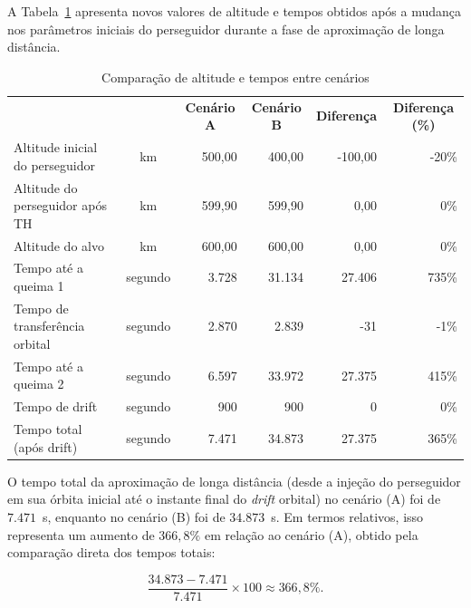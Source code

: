 A Tabela~\ref{tab_cap4_comp_alt_tempos} apresenta novos valores de altitude e tempos obtidos após a mudança nos parâmetros iniciais do perseguidor durante a fase de aproximação de longa distância.

\begin{table}[H]
\centering
\caption{Comparação de altitude e tempos entre cenários}
\begin{tabularx}{\linewidth}{|>{\raggedright\arraybackslash}X|
                             >{\raggedright\arraybackslash}c|
                             r|r|r|r|}
\hline
\multicolumn{1}{|c|}{\textbf{Variável}} &
\multicolumn{1}{c|}{\textbf{Unidade}} &
\multicolumn{1}{c|}{\textbf{Cenário A}} &
\multicolumn{1}{c|}{\textbf{Cenário B}} &
\multicolumn{1}{c|}{\textbf{Diferença}} &
\multicolumn{1}{c|}{\textbf{Diferença (\%)}} \\
\hhline{|=|=|=|=|=|=|}
Altitude inicial do perseguidor      & km     & 500,00 & 400,00 & -100,00 & -20\% \\
\hline
Altitude do perseguidor após TH      & km     & 599,90 & 599,90 & 0,00    & 0\%   \\
\hline
Altitude do alvo                     & km     & 600,00 & 600,00 & 0,00    & 0\%   \\
\hline
Tempo até a queima 1                 & segundo& 3.728  & 31.134 & 27.406  & 735\% \\
\hline
Tempo de transferência orbital       & segundo& 2.870  & 2.839  & -31     & -1\%  \\
\hline
Tempo até a queima 2                 & segundo& 6.597  & 33.972 & 27.375  & 415\% \\
\hline
Tempo de drift                       & segundo& 900    & 900    & 0       & 0\%   \\
\hline
Tempo total (após drift)             & segundo& 7.471  & 34.873 & 27.375  & 365\% \\
\hline
\end{tabularx}
\label{tab_cap4_comp_alt_tempos}
\end{table}

O tempo total da aproximação de longa distância (desde a injeção do perseguidor em sua órbita inicial até o instante final do \emph{drift} orbital) no cenário (A) foi de $7.471$~s, enquanto no cenário (B) foi de $34.873$~s.
Em termos relativos, isso representa um aumento de $366{,}8\%$ em relação ao cenário (A), obtido pela comparação direta dos tempos totais:

\begin{equation}
\frac{34.873 - 7.471}{7.471}\times 100 \approx 366{,}8\%.
\end{equation}


